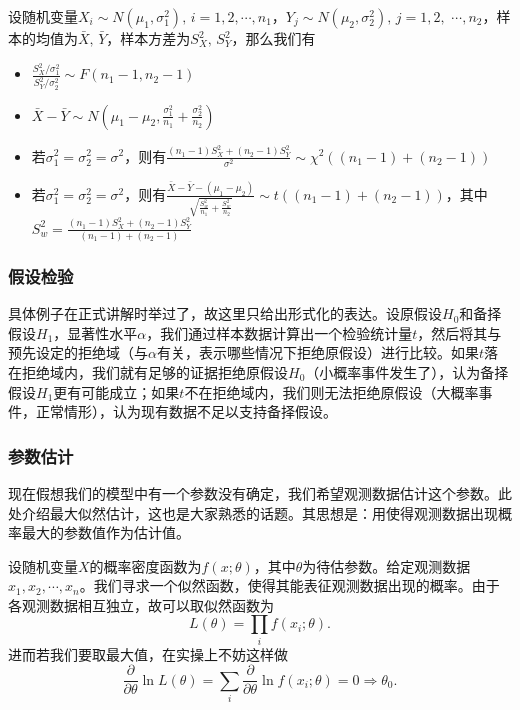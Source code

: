 \documentclass[a4paper, 12pt]{article}
\begin{document}
    设随机变量$X_i\sim N(\mu_1,\sigma_1^2),\,i=1,2,\cdots,n_1$，$Y_j\sim N(\mu_2,\sigma_2^2),\,j=1,2,$ $\cdots,n_2$，样本的均值为$\bar{X},\,\bar{Y}$，样本方差为$S_X^2,\,S_Y^2$，那么我们有

    \begin{itemize}
        \item $\frac{S_X^2/\sigma_1^2}{S_Y^2/\sigma_2^2}\sim F(n_1-1,n_2-1)$
        \item $\bar{X}-\bar{Y}\sim N\left(\mu_1-\mu_2,\frac{\sigma_1^2}{n_1}+\frac{\sigma_2^2}{n_2}\right)$
        \item 若$\sigma_1^2=\sigma_2^2=\sigma^2$，则有$\frac{(n_1-1)S_X^2+(n_2-1)S_Y^2}{\sigma^2}\sim\chi^2((n_1-1)+(n_2-1))$
        \item 若$\sigma_1^2=\sigma_2^2=\sigma^2$，则有$\frac{\bar{X}-\bar{Y}-(\mu_1-\mu_2)}{\sqrt{\frac{S_w^2}{n_1}+\frac{S_w^2}{n_2}}}\sim t((n_1-1)+(n_2-1))$，其中$S_w^2=\frac{(n_1-1)S_X^2+(n_2-1)S_Y^2}{(n_1-1)+(n_2-1)}$
    \end{itemize}

    \subsubsection{假设检验}

    具体例子在正式讲解时举过了，故这里只给出形式化的表达。设原假设$H_0$和备择假设$H_1$，显著性水平$\alpha$，我们通过样本数据计算出一个检验统计量$t$，然后将其与预先设定的拒绝域（与$\alpha$有关，表示哪些情况下拒绝原假设）进行比较。如果$t$落在拒绝域内，我们就有足够的证据拒绝原假设$H_0$（小概率事件发生了），认为备择假设$H_1$更有可能成立；如果$t$不在拒绝域内，我们则无法拒绝原假设（大概率事件，正常情形），认为现有数据不足以支持备择假设。

    \subsubsection{参数估计}

    现在假想我们的模型中有一个参数没有确定，我们希望观测数据估计这个参数。此处介绍最大似然估计，这也是大家熟悉的话题。其思想是：用使得观测数据出现概率最大的参数值作为估计值。

    设随机变量$X$的概率密度函数为$f(x;\theta)$，其中$\theta$为待估参数。给定观测数据$x_1,x_2,\cdots,x_n$。我们寻求一个似然函数，使得其能表征观测数据出现的概率。由于各观测数据相互独立，故可以取似然函数为
    \[
    L(\theta)=\prod_i f(x_i;\theta).
    \]
    进而若我们要取最大值，在实操上不妨这样做
    \[
    \frac{\partial}{\partial\theta}\ln L(\theta)=\sum_i \frac{\partial}{\partial\theta}\ln f(x_i;\theta)=0\Rightarrow \theta_0.
    \]
\end{document}

